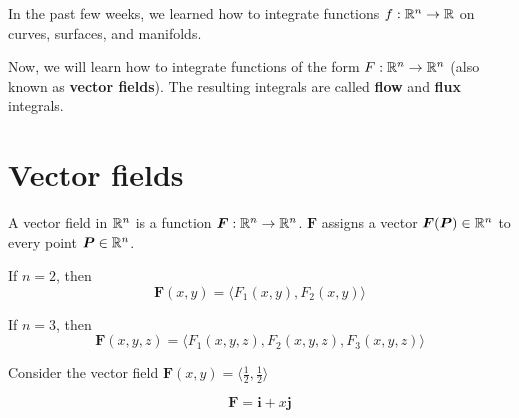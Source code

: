 In the past few weeks, we learned how to integrate functions $f : \mathbb{R}^n \to \mathbb{R}$ on curves, surfaces, and manifolds.
    
    \vspace{.5em}
    
    Now, we will learn how to integrate functions of the form $F: \mathbb{R}^n \to \mathbb{R}^n$ (also known as \textbf{vector fields}).  The resulting integrals are called \textbf{flow} and \textbf{flux} integrals.

\section{Vector fields}

\begin{definition}
    A vector field in $\mathbb{R}^n$ is a function $\bm{F} : \mathbb{R}^n \to \mathbb{R}^n$.  $\bm{F}$ assigns a vector $\bm{F}(\bm{P}) \in \mathbb{R}^n$ to every point $\bm{P}\in \mathbb{R}^n$.

\end{definition}

\begin{example}

    If $n=2$, then $$\bm{F}(x,y) = \langle F_1(x,y), F_2(x,y)\rangle$$
    
    If $n=3$, then $$\bm{F}(x,y,z) = \langle F_1(x,y,z), F_2(x,y,z), F_3(x,y,z)\rangle$$
    
\end{example}

\begin{example}
    
    Consider the vector field $\bm{F}(x,y) = \langle \frac{1}{2}, \frac{1}{2}\rangle$

    \begin{center}
    \end{center}

\end{example}

\begin{example}
    $$\bm{F} = \bm{i} + x\bm{j}$$

\begin{center}
    \end{center}
    
\end{example}


